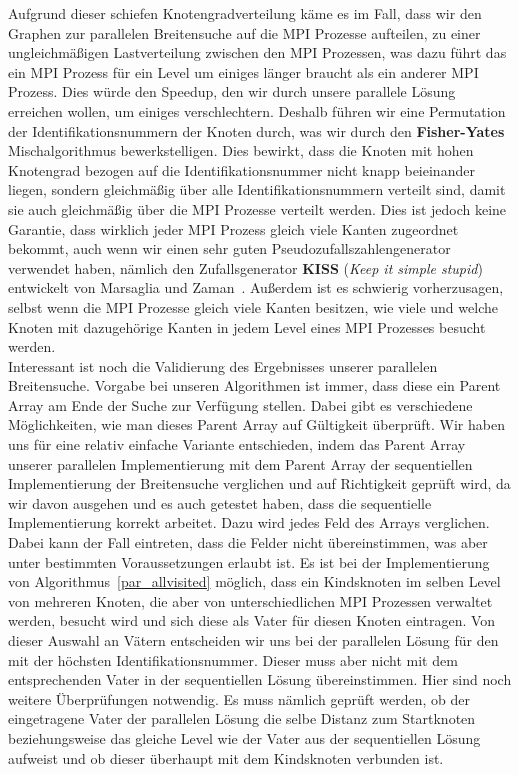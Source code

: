 \documentclass[11pt,a4paper]{article}
\begin{document}
Aufgrund dieser schiefen Knotengradverteilung käme es im Fall, dass wir den Graphen zur parallelen Breitensuche auf die MPI Prozesse aufteilen, zu einer ungleichmäßigen Lastverteilung zwischen den MPI Prozessen, was dazu führt das ein MPI Prozess für ein Level um einiges länger braucht als ein anderer MPI Prozess. Dies würde den Speedup, den wir durch unsere parallele Lösung erreichen wollen, um einiges verschlechtern. Deshalb führen wir eine Permutation der Identifikationsnummern der Knoten durch, was wir durch den \textbf{Fisher-Yates} Mischalgorithmus bewerkstelligen. Dies bewirkt, dass die Knoten mit hohen Knotengrad bezogen auf die Identifikationsnummer nicht knapp beieinander liegen, sondern gleichmäßig über alle Identifikationsnummern verteilt sind, damit sie auch gleichmäßig über die MPI Prozesse verteilt werden. Dies ist jedoch keine Garantie, dass wirklich jeder MPI Prozess gleich viele Kanten zugeordnet bekommt, auch wenn wir einen sehr guten Pseudozufallszahlengenerator verwendet haben, nämlich den Zufallsgenerator \textbf{KISS} (\textit{Keep it simple stupid}) entwickelt von Marsaglia und Zaman~\cite{kiss}. Außerdem ist es schwierig vorherzusagen, selbst wenn die MPI Prozesse gleich viele Kanten besitzen, wie viele und welche Knoten mit dazugehörige Kanten in jedem Level eines MPI Prozesses besucht werden.\\
Interessant ist noch die Validierung des Ergebnisses unserer parallelen Breitensuche. Vorgabe bei unseren Algorithmen ist immer, dass diese ein Parent Array am Ende der Suche zur Verfügung stellen. Dabei gibt es verschiedene Möglichkeiten, wie man dieses Parent Array auf Gültigkeit überprüft. Wir haben uns für eine relativ einfache Variante entschieden, indem das Parent Array unserer parallelen Implementierung mit dem Parent Array der sequentiellen Implementierung der Breitensuche verglichen und auf Richtigkeit geprüft wird, da wir davon ausgehen und es auch getestet haben, dass die sequentielle Implementierung korrekt arbeitet. Dazu wird jedes Feld des Arrays verglichen. Dabei kann der Fall eintreten, dass die Felder nicht übereinstimmen, was aber unter bestimmten Voraussetzungen erlaubt ist. Es ist bei der Implementierung von Algorithmus~\ref{par_allvisited} möglich, dass ein Kindsknoten im selben Level von mehreren Knoten, die aber von unterschiedlichen MPI Prozessen verwaltet werden, besucht wird und sich diese als Vater für diesen Knoten eintragen. Von dieser Auswahl an Vätern entscheiden wir uns bei der parallelen Lösung für den mit der höchsten Identifikationsnummer. Dieser muss aber nicht mit dem entsprechenden Vater in der sequentiellen Lösung übereinstimmen. Hier sind noch weitere Überprüfungen notwendig. Es muss nämlich geprüft werden, ob der eingetragene Vater der parallelen Lösung die selbe Distanz zum Startknoten beziehungsweise das gleiche Level wie der Vater aus der sequentiellen Lösung aufweist und ob dieser überhaupt mit dem Kindsknoten verbunden ist.\\
\end{document}

